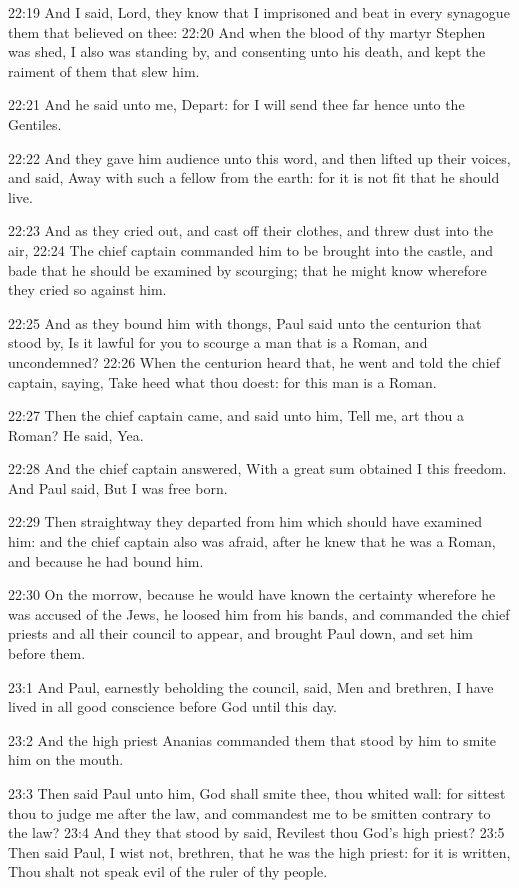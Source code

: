 22:19 And I said, Lord, they know that I imprisoned and beat in every synagogue them that believed on thee: 22:20 And when the blood of thy martyr Stephen was shed, I also was standing by, and consenting unto his death, and kept the raiment of them that slew him.

22:21 And he said unto me, Depart: for I will send thee far hence unto the Gentiles.

22:22 And they gave him audience unto this word, and then lifted up their voices, and said, Away with such a fellow from the earth: for it is not fit that he should live.

22:23 And as they cried out, and cast off their clothes, and threw dust into the air, 22:24 The chief captain commanded him to be brought into the castle, and bade that he should be examined by scourging; that he might know wherefore they cried so against him.

22:25 And as they bound him with thongs, Paul said unto the centurion that stood by, Is it lawful for you to scourge a man that is a Roman, and uncondemned?  22:26 When the centurion heard that, he went and told the chief captain, saying, Take heed what thou doest: for this man is a Roman.

22:27 Then the chief captain came, and said unto him, Tell me, art thou a Roman? He said, Yea.

22:28 And the chief captain answered, With a great sum obtained I this freedom. And Paul said, But I was free born.

22:29 Then straightway they departed from him which should have examined him: and the chief captain also was afraid, after he knew that he was a Roman, and because he had bound him.

22:30 On the morrow, because he would have known the certainty wherefore he was accused of the Jews, he loosed him from his bands, and commanded the chief priests and all their council to appear, and brought Paul down, and set him before them.

23:1 And Paul, earnestly beholding the council, said, Men and brethren, I have lived in all good conscience before God until this day.

23:2 And the high priest Ananias commanded them that stood by him to smite him on the mouth.

23:3 Then said Paul unto him, God shall smite thee, thou whited wall: for sittest thou to judge me after the law, and commandest me to be smitten contrary to the law?  23:4 And they that stood by said, Revilest thou God's high priest?  23:5 Then said Paul, I wist not, brethren, that he was the high priest: for it is written, Thou shalt not speak evil of the ruler of thy people.

